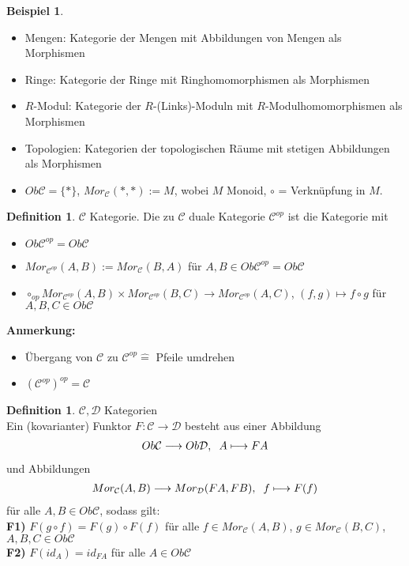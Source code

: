 \documentclass[10pt,a4paper,numbers=endperiod]{scrreprt}
\theoremstyle{definition}
\newtheorem{defi}[satz]{Definition}
\newtheorem{bsp}[satz]{Beispiel}
\begin{document}
\begin{bsp}
	\begin{itemize}
		\item Mengen: Kategorie der Mengen mit Abbildungen von Mengen als Morphismen
		\item Ringe: Kategorie der Ringe mit Ringhomomorphismen als Morphismen
		\item $R$-Modul: Kategorie der $R$-(Links)-Moduln mit $R$-Modulhomomorphismen als Morphismen
		\item Topologien: Kategorien der topologischen Räume mit stetigen Abbildungen als Morphismen
		\item $Ob \mathcal{C} = \{*\}$, $Mor_{\mathcal{C}} (*, *) := M$, wobei $M$ Monoid, $\circ$ = Verknüpfung in $M$.
	\end{itemize}
\end{bsp}

\begin{defi}
	$\mathcal{C}$ Kategorie. Die zu $\mathcal{C}$ duale Kategorie $\mathcal{C}^{op}$ ist die Kategorie mit \begin{itemize}
		\item $Ob \mathcal{C}^{op} = Ob \mathcal{C}$
		\item $Mor_{\mathcal{C}^{op}} (A,B) := Mor_{\mathcal{C}} (B, A)$ für $A, B \in Ob \mathcal{C}^{op} = Ob \mathcal{C}$
		\item $\circ_{op} Mor_{\mathcal{C}^{op}} (A,B) \times Mor_{\mathcal{C}^{op}} (B, C) \longrightarrow Mor_{\mathcal{C}^{op}} (A,C)$, $(f,g) \longmapsto f \circ g$ für $A, B, C \in Ob \mathcal{C}$
	\end{itemize}
\end{defi}

\textbf{Anmerkung:} \begin{itemize}
	\item Übergang von $\mathcal{C}$ zu $\mathcal{C}^{op} \hat{=}$ Pfeile umdrehen
	\item $(\mathcal{C}^{op})^{op} = \mathcal{C}$
\end{itemize}

\begin{defi}
	$\mathcal{C}, \mathcal{D}$ Kategorien\\
	Ein (kovarianter) Funktor $F: \mathcal{C} \rightarrow \mathcal{D}$ besteht aus einer Abbildung \begin{align*}
		Ob \mathcal{C} \longrightarrow Ob \mathcal{D}, \hspace*{2mm} A \longmapsto FA
	\end{align*}
	und Abbildungen \begin{align*}
		Mor_{\mathcal{C}} (A, B) \longrightarrow Mor_{\mathcal{D}} (FA, FB), \hspace*{2mm} f \longmapsto F(f)
	\end{align*}
	für alle $A, B \in Ob \mathcal{C}$, sodass gilt:\\
	\textbf{F1)} $F(g \circ f) = F(g) \circ F(f)$ für alle $f \in Mor_{\mathcal{C}}(A, B)$, $g \in Mor_{\mathcal{C}}(B,C)$, $A, B, C \in Ob \mathcal{C}$\\
	\textbf{F2)} $F(id_A) = id_{FA}$ für alle $A \in Ob \mathcal{C}$
\end{defi}
\end{document}
